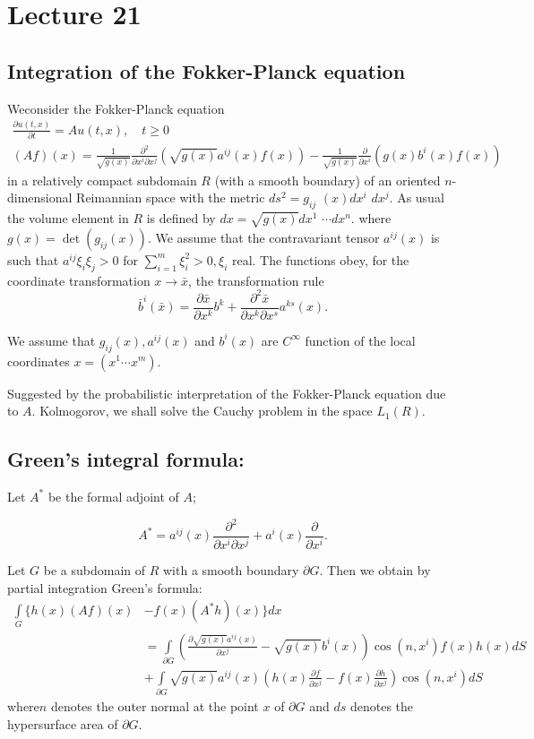 \chapter{Lecture 21}\label{chap21}%

\section{Integration of the Fokker-Planck equation}\label{chap21:sec1}

We\pageoriginale consider the Fokker-Planck equation
\begin{gather*}
 \frac{\partial u(t,x)}{\partial t}=Au(t,x), \quad t \geq 0\\
 (Af)(x)=\frac{1}{\sqrt{g(x)}} \frac{\partial^2}{\partial x^i \partial
  x^j}
 (\sqrt{g(x)} a^{ij}(x)f(x))-\frac{1}{\sqrt{g(x)}}\frac{\partial}{\partial
  x^i}(g(x)b^i(x)f(x)) 
\end{gather*}
in a relatively compact subdomain $R$ (with a smooth boundary) of an
oriented $n$-dimensional Reimannian space with the metric
$ds^2=g_{ij}$ $(x)dx^i$ $dx^j$. As usual the volume element in $R$ is
defined by $dx=\sqrt {g(x)}dx^1$ $\cdots dx^n$. where $g(x)=\det
(g_{ij}(x))$. We assume that the contravariant tensor $a^{ij}(x)$ is
such that $a^{ij}\xi_i \xi_j >0$ for $\sum \limits^m_{i=1}\xi^2_i
>0,\xi_i$ real. The functions obey, for the coordinate transformation
$x\to \bar{x}$, the transformation rule 
$$
\bar{b}^i(\bar{x})=\frac{\partial \bar{x}}{\partial x^k}b^k +
\frac{\partial^2 \bar{x}}{\partial x^k \partial x^s} a^{ks}(x). 
$$

We assume that $g_{ij}(x),a^{ij}(x)$ and $b^i(x)$ are $C^\infty$
function of the local coordinates $x=(x^1 \cdots x^m)$. 

Suggested by the probabilistic interpretation of the Fokker-Planck
equation due to $A$. Kolmogorov, we shall solve the Cauchy problem in
the space $L_1(R)$. 

\section*{Green's integral formula:}

Let $A^*$ be the formal adjoint of $A$;

$$
A^*=a^{ij}(x)\frac{\partial^2}{\partial x^i \partial x^j}+a^i
(x)\frac{\partial}{\partial x^i}. 
$$

Let $G$ be a subdomain of $R$ with a smooth boundary $\partial
G$. Then we obtain by partial integration Green's formula: 
{\fontsize{10pt}{12pt}\selectfont
\begin{align*}
\int \limits_G \{ h(x)(Af)(x) & -f(x)(A^*h)(x) \} dx\\
 & =\int \limits_{\partial G} \left( \frac{\partial
  \sqrt{g(x)}a^{ij}(x)}{\partial x^j}-\sqrt{g(x)} b^i (x)\right) 
  \cos (n,x^i)f(x)h(x)dS\\ 
 & +\int \limits_{\partial G} \sqrt{g(x)}a^{ij}(x) \left(h(x) \frac{\partial
  f}{\partial x^j}-f (x)\frac{\partial h}{\partial x^j}\right) \cos (n,
 x^i)dS 
\end{align*}}\relax
where\pageoriginale $n$ denotes the outer normal at the point $x$ of $\partial G$
and $ds$ denotes the hypersurface area of $\partial G$. 

